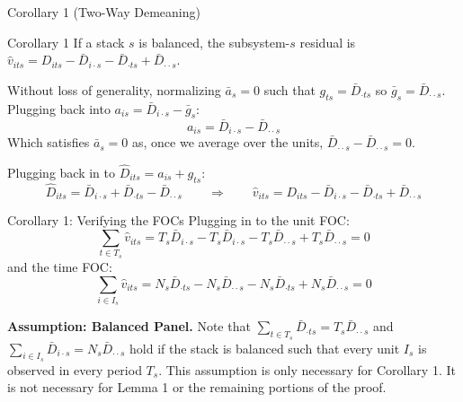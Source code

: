 \documentclass[11pt]{beamer}
\begin{document}
\begin{frame}{Corollary 1 (Two-Way Demeaning)}
    \begin{block}{Corollary 1}
        If a stack $s$ is balanced, the subsystem-$s$ residual is
        $\hat{v}_{its} = D_{its} - \bar{D}_{i \cdot s} - \bar{D}_{\cdot ts} + \bar{D}_{\cdot \cdot s}$.
    \end{block}

    Without loss of generality, normalizing $\bar{a}_s = 0$ such that
    $g_{ts} = \bar{D}_{\cdot ts}$ so $\bar{g}_s = \bar{D}_{\cdot \cdot s}$.
    Plugging back into $a_{is} = \bar{D}_{i \cdot s} - \bar{g}_s$:
    \[
        a_{is} = \bar{D}_{i \cdot s} - \bar{D}_{\cdot \cdot s}
    \]
    Which satisfies $\bar{a}_s = 0$ as, once we average over the units,
    $\bar{D}_{\cdot \cdot s} - \bar{D}_{\cdot \cdot s} = 0$.

    \vspace{3mm}

    Plugging back in to $\hat{D}_{its} = a_{is} + g_{ts}$:
    \[
        \hat{D}_{its} = \bar{D}_{i \cdot s} + \bar{D}_{\cdot ts} - \bar{D}_{\cdot \cdot s}
        \qquad \Longrightarrow \qquad
        \hat{v}_{its} = D_{its} - \bar{D}_{i \cdot s} - \bar{D}_{\cdot ts} + \bar{D}_{\cdot \cdot s}
    \]
\end{frame}

\begin{frame}{Corollary 1: Verifying the FOCs}
    Plugging in to the unit FOC:
    \[
        \sum_{t \in T_s} \hat{v}_{its}
        = T_s \bar{D}_{i \cdot s} - T_s \bar{D}_{i \cdot s}
          - T_s \bar{D}_{\cdot \cdot s} + T_s \bar{D}_{\cdot \cdot s} = 0
    \]
    and the time FOC:
    \[
        \sum_{i \in I_s} \hat{v}_{its}
        = N_s \bar{D}_{\cdot ts} - N_s \bar{D}_{\cdot \cdot s}
          - N_s \bar{D}_{\cdot ts} + N_s \bar{D}_{\cdot \cdot s} = 0
    \]

    \vspace{3mm}

    \textbf{Assumption: Balanced Panel.} Note that
    $\sum_{t \in T_s} \bar{D}_{\cdot ts} = T_s \bar{D}_{\cdot \cdot s}$ and
    $\sum_{i \in I_s} \bar{D}_{i \cdot s} = N_s \bar{D}_{\cdot \cdot s}$ hold if
    the stack is balanced such that every unit $I_s$ is observed in every period
    $T_s$. This assumption is only necessary for Corollary 1. It is not
    necessary for Lemma 1 or the remaining portions of the proof.
\end{frame}
\end{document}
